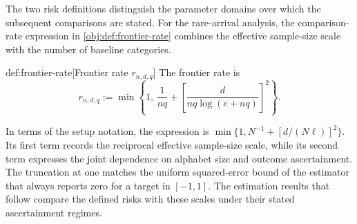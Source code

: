 The two risk definitions distinguish the parameter domains over which the subsequent comparisons are stated. For the rare-arrival analysis, the comparison-rate expression  in \cref{obj:def:frontier-rate} combines the effective sample-size scale with the number of baseline categories.

\begin{definitionv}{def:frontier-rate}[Frontier rate \(r_{n,d,q}\)]
The frontier rate is
\[
r_{n,d,q}
:=
\min\left\{
1,\,
\frac{1}{nq}
+
\left[\frac{d}{nq\log(e+nq)}\right]^2
\right\}.
\]
\end{definitionv}

In terms of the setup notation, the expression is \(\min\{1,N^{-1}+[d/(N\ell)]^2\}\). Its first term records the reciprocal effective sample-size scale, while its second term expresses the joint dependence on alphabet size and outcome ascertainment. The truncation at one matches the uniform squared-error bound of the estimator that always reports zero for a target in \([-1,1]\). The estimation results that follow compare the defined risks with these scales under their stated ascertainment regimes.
